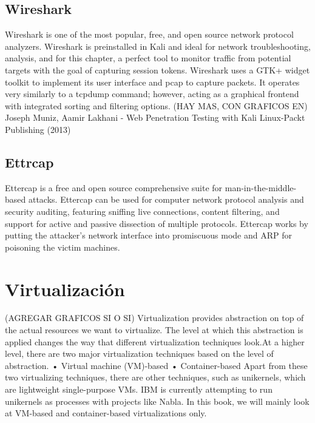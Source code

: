 \subsection{Wireshark}
Wireshark is one of the most popular, free, and open source network protocol
analyzers. Wireshark is preinstalled in Kali and ideal for network troubleshooting,
analysis, and for this chapter, a perfect tool to monitor traffic from potential targets
with the goal of capturing session tokens. Wireshark uses a GTK+ widget toolkit to
implement its user interface and pcap to capture packets. It operates very similarly to
a tcpdump command; however, acting as a graphical frontend with integrated sorting
and filtering options.
(HAY MAS, CON GRAFICOS EN)
Joseph Muniz, Aamir Lakhani - Web Penetration Testing with Kali Linux-Packt Publishing (2013)

    \subsection{Ettrcap}
    Ettercap is a free and open source comprehensive suite for man-in-the-middle-based
attacks.
Ettercap can be used for computer network protocol analysis and security auditing,
featuring sniffing live connections, content filtering, and support for active and passive
dissection of multiple protocols. Ettercap works by putting the attacker's network
interface into promiscuous mode and ARP for poisoning the victim machines.
\section{Virtualización}
(AGREGAR GRAFICOS SI O SI)
Virtualization provides abstraction on top of the actual resources we want to virtualize.
 The level at which this abstraction is applied changes the way that different
  virtualization techniques look.At a higher level, there are two major
   virtualization techniques based on the level of abstraction.
   • Virtual machine (VM)-based
   • Container-based
   Apart from these two virtualizing techniques, there are other techniques, such as unikernels, which are lightweight single-purpose VMs. IBM is currently attempting to run unikernels as processes with projects like Nabla. In this book, we will mainly look at VM-based and container-based virtualizations only.
